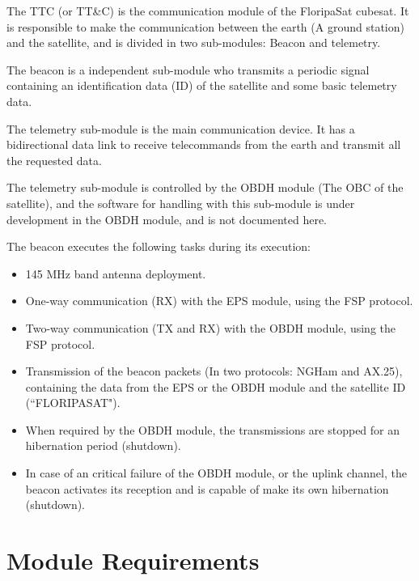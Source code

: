 \documentclass[12pt]{book}
\begin{document}
The TTC (or TT\&C) is the communication module of the FloripaSat\cite{site} cubesat. It is responsible to make the communication between the earth (A ground station) and the satellite, and is divided in two sub-modules: Beacon and telemetry.

The beacon is a independent sub-module who transmits a periodic signal containing an identification data (ID) of the satellite and some basic telemetry data.

The telemetry sub-module is the main communication device. It has a bidirectional data link to receive telecommands from the earth and transmit all the requested data.

The telemetry sub-module is controlled by the OBDH module (The OBC of the satellite), and the software for handling with this sub-module is under development in the OBDH module, and is not documented here.


\cite{github}

The beacon executes the following tasks during its execution:

\begin{itemize}
	\item 145 MHz band antenna deployment.
	\item One-way communication (RX) with the EPS module, using the FSP protocol.
	\item Two-way communication (TX and RX) with the OBDH module, using the FSP protocol.
	\item Transmission of the beacon packets (In two protocols: NGHam and AX.25), containing the data from the EPS or the OBDH module and the satellite ID (``FLORIPASAT").
	\item When required by the OBDH module, the transmissions are stopped for an hibernation period (shutdown).
	\item In case of an critical failure of the OBDH module, or the uplink channel, the beacon activates its reception and is capable of make its own hibernation (shutdown).
\end{itemize}

\section{Module Requirements}
\end{document}
